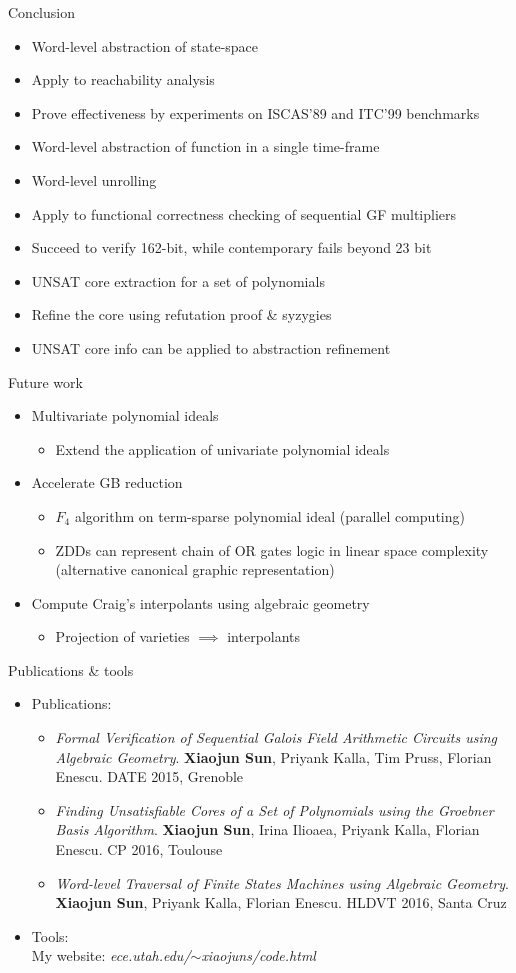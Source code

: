 \documentclass[xcolor=dvipsnames]{beamer}
\newcommand{\bi}{\begin{itemize}}
\newcommand{\ei}{\end{itemize}}
\begin{document}
\begin{frame}{\large{Conclusion}}
\bi
\item Word-level abstraction of state-space
\item Apply to reachability analysis
\item Prove effectiveness by experiments on ISCAS'89 and ITC'99 benchmarks
\ei
\bi
\item Word-level abstraction of function in a single time-frame
\item Word-level unrolling
\item Apply to functional correctness checking of sequential GF multipliers
\item Succeed to verify 162-bit, while contemporary fails beyond 23 bit 
\ei
\bi
\item UNSAT core extraction for a set of polynomials
\item Refine the core using refutation proof \& syzygies
\item UNSAT core info can be applied to abstraction refinement
\ei
\end{frame}
\begin{frame}{\large{Future work}}
\bi
\item Multivariate polynomial ideals
	\bi
	\item Extend the application of univariate polynomial ideals
	\ei
\ei
\bi
\item Accelerate GB reduction
	\bi
	\item $F_4$ algorithm on term-sparse polynomial ideal (parallel computing)
	\item ZDDs can represent chain of OR gates logic in linear space complexity (alternative canonical graphic representation)
	\ei
\ei
\bi
\item Compute Craig's interpolants using algebraic geometry
	\bi
	\item Projection of varieties $\implies$ interpolants
	\ei
\ei
\end{frame}
\begin{frame}{\large{Publications \& tools}}
\bi
\item Publications:
	\bi
	\item {\it Formal Verification of Sequential Galois Field Arithmetic Circuits using Algebraic Geometry}. {\bf Xiaojun Sun}, Priyank Kalla, Tim Pruss, Florian Enescu. DATE 2015, Grenoble
	\item {\it Finding Unsatisfiable Cores of a Set of Polynomials using the Groebner Basis Algorithm}. {\bf Xiaojun Sun}, Irina Ilioaea, Priyank Kalla, Florian Enescu. CP 2016, Toulouse
	\item {\it Word-level Traversal of Finite States Machines using Algebraic Geometry}. {\bf Xiaojun Sun}, Priyank Kalla, Florian Enescu. HLDVT 2016, Santa Cruz
	\ei
\item Tools:\\
My website: {\it ece.utah.edu/$\sim$xiaojuns/code.html}
\ei
\end{frame}
\end{document}
